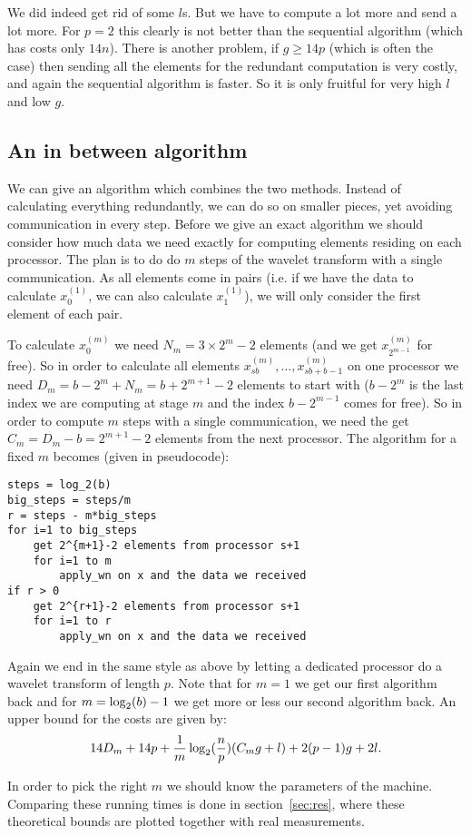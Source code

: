 We did indeed get rid of some $l$s. But we have to compute a lot more and send a lot more. For $p=2$ this clearly is not better than the sequential algorithm (which has costs only $14n$). There is another problem, if $g \geq 14p$ (which is often the case) then sending all the elements for the redundant computation is very costly, and again the sequential algorithm is faster. So it is only fruitful for very high $l$ and low $g$.


\subsection{An in between algorithm}
We can give an algorithm which combines the two methods. Instead of calculating everything redundantly, we can do so on smaller pieces, yet avoiding communication in every step. Before we give an exact algorithm we should consider how much data we need exactly for computing elements residing on each processor. The plan is to do do $m$ steps of the wavelet transform with a single communication. As all elements come in pairs (i.e. if we have the data to calculate $x^{(1)}_0$, we can also calculate $x^{(1)}_1$), we will only consider the first element of each pair.

To calculate $x^{(m)}_0$ we need $N_m = 3 \times 2^m-2$ elements (and we get $x^{(m)}_{2^{m-1}}$ for free). So in order to calculate all elements $x^{(m)}_{sb}, \ldots, x^{(m)}_{sb+b-1}$ on one processor we need $D_m = b - 2^m + N_m = b + 2^{m+1} - 2$ elements to start with ($b-2^m$ is the last index we are computing at stage $m$ and the index $b - 2^{m-1}$ comes for free). So in order to compute $m$ steps with a single communication, we need the get $C_m = D_m - b = 2^{m+1} - 2$ elements from the next processor. The algorithm for a fixed $m$ becomes (given in pseudocode):

\begin{lstlisting}
steps = log_2(b)
big_steps = steps/m
r = steps - m*big_steps
for i=1 to big_steps
	get 2^{m+1}-2 elements from processor s+1
	for i=1 to m
		apply_wn on x and the data we received
if r > 0
	get 2^{r+1}-2 elements from processor s+1
	for i=1 to r
		apply_wn on x and the data we received
\end{lstlisting}

Again we end in the same style as above by letting a dedicated processor do a wavelet transform of length $p$. Note that for $m=1$ we get our first algorithm back and for $m = \operatorname{\log_2}(b)-1$ we get more or less our second algorithm back. An upper bound for the costs are given by:
\[ 14D_m + 14p + \frac{1}{m}\operatorname{\log_2}(\frac{n}{p})(C_mg+l) + 2(p-1)g + 2l. \]

In order to pick the right $m$ we should know the parameters of the machine. Comparing these running times is done in section~\ref{sec:res}, where these theoretical bounds are plotted together with real measurements.
